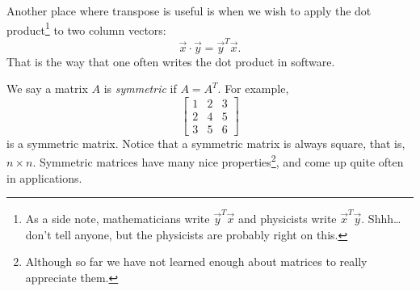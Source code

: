 Another place where transpose is useful is when we wish to apply the dot
product\footnote{As a side note, mathematicians
write $\vec{y}^T\vec{x}$ and physicists
write $\vec{x}^T\vec{y}$.  Shhh\ldots don't tell anyone, but the physicists
are probably right on this.}
to two column vectors:
\begin{equation*}
\vec{x} \cdot \vec{y} = \vec{y}^T \vec{x} .
\end{equation*}
That is the way that one often writes the dot product in software.

We say a matrix $A$ is \emph{symmetric}
if $A = A^T$.  For example,
\begin{equation*}
\begin{bmatrix}
1 & 2 & 3 \\
2 & 4 & 5 \\
3 & 5 & 6
\end{bmatrix}
\end{equation*}
is a symmetric matrix.  Notice that a symmetric matrix is always
square, that is, $n \times n$.  Symmetric matrices 
have many nice properties\footnote{Although so far we have not learned
enough about matrices to really appreciate them.},
and come up quite often in applications.

